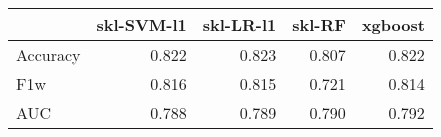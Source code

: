 \begin{tabular}{lrrrr}
\toprule
{} &  skl-SVM-l1 &  skl-LR-l1 &  skl-RF &  xgboost \\
\midrule
Accuracy &       0.822 &      0.823 &   0.807 &    0.822 \\
F1w      &       0.816 &      0.815 &   0.721 &    0.814 \\
AUC      &       0.788 &      0.789 &   0.790 &    0.792 \\
\bottomrule
\end{tabular}
